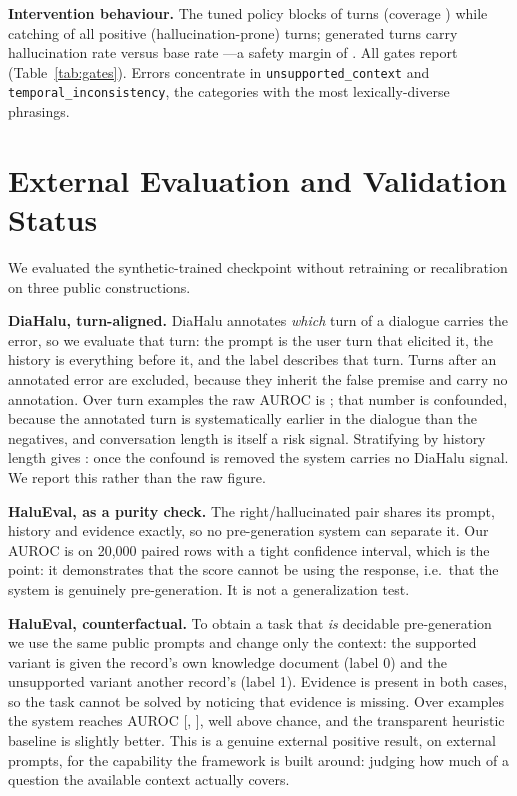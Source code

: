 \documentclass[10pt]{article}
\begin{document}
\textbf{Intervention behaviour.} The tuned policy blocks \blockedshare{} of turns
(coverage \coverage) while catching \caught{} of all positive (hallucination-prone)
turns; generated turns carry hallucination rate \riskgenerated{}
versus base rate \riskoverall---a safety margin of \safetymargin. All gates
report \gatestatus{} (Table~\ref{tab:gates}).
Errors concentrate in \texttt{unsupported\_context} and
\texttt{temporal\_inconsistency}, the categories with the most
lexically-diverse phrasings.

\section{External Evaluation and Validation Status}
We evaluated the synthetic-trained checkpoint without retraining or
recalibration on three public constructions.

\textbf{DiaHalu, turn-aligned.} DiaHalu annotates \emph{which} turn of a
dialogue carries the error, so we evaluate that turn: the prompt is the user
turn that elicited it, the history is everything before it, and the label
describes that turn. Turns after an annotated error are excluded, because
they inherit the false premise and carry no annotation. Over \dian{} turn
examples the raw AUROC is \diaauroc{}; that number is confounded, because
the annotated turn is systematically earlier in the dialogue than the
negatives, and conversation length is itself a risk signal. Stratifying by
history length gives \diastr{}: once the confound is removed the system
carries no DiaHalu signal. We report this rather than the raw figure.

\textbf{HaluEval, as a purity check.} The right/hallucinated pair shares its
prompt, history and evidence exactly, so no pre-generation system can
separate it. Our AUROC is \haluauroc{} on 20{,}000 paired rows with a tight
confidence interval, which is the point: it demonstrates that the score
cannot be using the response, i.e.\ that the system is genuinely
pre-generation. It is not a generalization test.

\textbf{HaluEval, counterfactual.} To obtain a task that \emph{is} decidable
pre-generation we use the same public prompts and change only the context:
the supported variant is given the record's own knowledge document (label 0)
and the unsupported variant another record's (label 1). Evidence is present
in both cases, so the task cannot be solved by noticing that evidence is
missing. Over \cfan{} examples the system reaches AUROC \cfauroc{}
[\cfaurocmin, \cfaurocmax], well above chance, and the transparent
heuristic baseline is slightly better. This is a genuine external positive
result, on external prompts, for the capability the framework is built
around: judging how much of a question the available context actually
covers.
\end{document}
